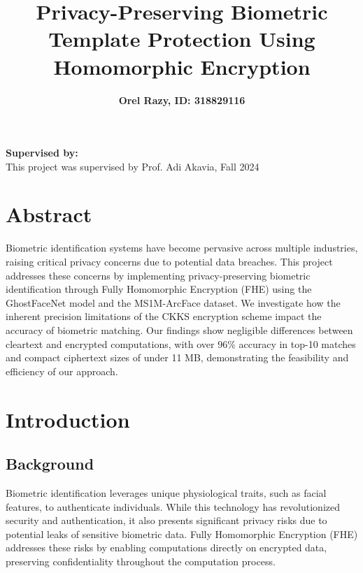 \documentclass[12pt,a4paper]{article}
\title{\textbf{Privacy-Preserving Biometric Template Protection Using Homomorphic Encryption}}
\author{\textbf{Orel Razy, ID: 318829116}}
\date{} %
\begin{document}
\maketitle

\begin{center}
\textbf{Supervised by:}\\
This project was supervised by Prof. Adi Akavia, Fall 2024
\end{center}

\bigskip

\section*{Abstract}
Biometric identification systems have become pervasive across multiple industries, raising critical 
privacy concerns due to potential data breaches. This project addresses these concerns by implementing 
privacy-preserving biometric identification through Fully Homomorphic Encryption (FHE) using the 
GhostFaceNet model and the MS1M-ArcFace dataset. We investigate how the inherent precision limitations 
of the CKKS encryption scheme impact the accuracy of biometric matching. Our findings show negligible 
differences between cleartext and encrypted computations, with over 96\% accuracy in top-10 matches 
and compact ciphertext sizes of under 11 MB, demonstrating the feasibility and efficiency of our 
approach.

\newpage

\section{Introduction}

\subsection{Background}
Biometric identification leverages unique physiological traits, such as facial features, to authenticate 
individuals. While this technology has revolutionized security and authentication, it also presents 
significant privacy risks due to potential leaks of sensitive biometric data. Fully Homomorphic 
Encryption (FHE) addresses these risks by enabling computations directly on encrypted data, preserving 
confidentiality throughout the computation process.
\end{document}
